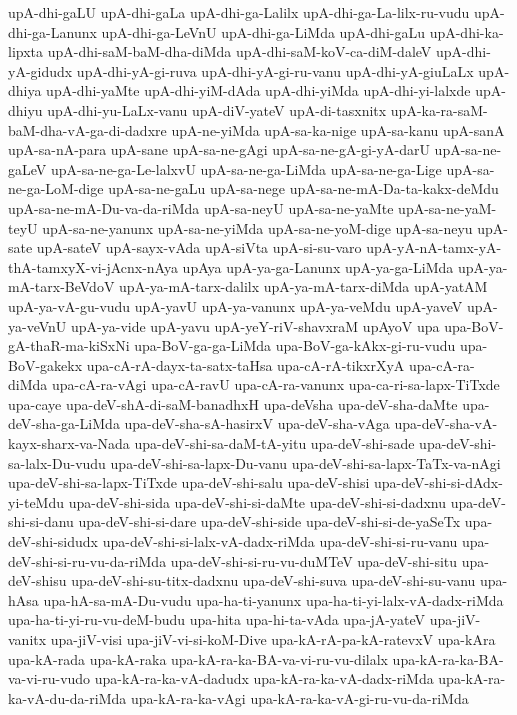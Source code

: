 {upA-dhi-gaLU
upA-dhi-gaLa
upA-dhi-ga-Lalilx
upA-dhi-ga-La-lilx-ru-vudu
upA-dhi-ga-Lanunx
upA-dhi-ga-LeVnU
upA-dhi-ga-LiMda
upA-dhi-gaLu
upA-dhi-ka-lipxta
upA-dhi-saM-baM-dha-diMda
upA-dhi-saM-koV-ca-diM-daleV
upA-dhi-yA-gidudx
upA-dhi-yA-gi-ruva
upA-dhi-yA-gi-ru-vanu
upA-dhi-yA-giuLaLx
upA-dhiya
upA-dhi-yaMte
upA-dhi-yiM-dAda
upA-dhi-yiMda
upA-dhi-yi-lalxde
upA-dhiyu
upA-dhi-yu-LaLx-vanu
upA-diV-yateV
upA-di-tasxnitx
upA-ka-ra-saM-baM-dha-vA-ga-di-dadxre
upA-ne-yiMda
upA-sa-ka-nige
upA-sa-kanu
upA-sanA
upA-sa-nA-para
upA-sane
upA-sa-ne-gAgi
upA-sa-ne-gA-gi-yA-darU
upA-sa-ne-gaLeV
upA-sa-ne-ga-Le-lalxvU
upA-sa-ne-ga-LiMda
upA-sa-ne-ga-Lige
upA-sa-ne-ga-LoM-dige
upA-sa-ne-gaLu
upA-sa-nege
upA-sa-ne-mA-Da-ta-kakx-deMdu
upA-sa-ne-mA-Du-va-da-riMda
upA-sa-neyU
upA-sa-ne-yaMte
upA-sa-ne-yaM-teyU
upA-sa-ne-yanunx
upA-sa-ne-yiMda
upA-sa-ne-yoM-dige
upA-sa-neyu
upA-sate
upA-sateV
upA-sayx-vAda
upA-siVta
upA-si-su-varo
upA-yA-nA-tamx-yA-thA-tamxyX-vi-jAcnx-nAya
upAya
upA-ya-ga-Lanunx
upA-ya-ga-LiMda
upA-ya-mA-tarx-BeVdoV
upA-ya-mA-tarx-dalilx
upA-ya-mA-tarx-diMda
upA-yatAM
upA-ya-vA-gu-vudu
upA-yavU
upA-ya-vanunx
upA-ya-veMdu
upA-yaveV
upA-ya-veVnU
upA-ya-vide
upA-yavu
upA-yeY-riV-shavxraM
upAyoV
upa
upa-BoV-gA-thaR-ma-kiSxNi
upa-BoV-ga-ga-LiMda
upa-BoV-ga-kAkx-gi-ru-vudu
upa-BoV-gakekx
upa-cA-rA-dayx-ta-satx-taHsa
upa-cA-rA-tikxrXyA
upa-cA-ra-diMda
upa-cA-ra-vAgi
upa-cA-ravU
upa-cA-ra-vanunx
upa-ca-ri-sa-lapx-TiTxde
upa-caye
upa-deV-shA-di-saM-banadhxH
upa-deVsha
upa-deV-sha-daMte
upa-deV-sha-ga-LiMda
upa-deV-sha-sA-hasirxV
upa-deV-sha-vAga
upa-deV-sha-vA-kayx-sharx-va-Nada
upa-deV-shi-sa-daM-tA-yitu
upa-deV-shi-sade
upa-deV-shi-sa-lalx-Du-vudu
upa-deV-shi-sa-lapx-Du-vanu
upa-deV-shi-sa-lapx-TaTx-va-nAgi
upa-deV-shi-sa-lapx-TiTxde
upa-deV-shi-salu
upa-deV-shisi
upa-deV-shi-si-dAdx-yi-teMdu
upa-deV-shi-sida
upa-deV-shi-si-daMte
upa-deV-shi-si-dadxnu
upa-deV-shi-si-danu
upa-deV-shi-si-dare
upa-deV-shi-side
upa-deV-shi-si-de-yaSeTx
upa-deV-shi-sidudx
upa-deV-shi-si-lalx-vA-dadx-riMda
upa-deV-shi-si-ru-vanu
upa-deV-shi-si-ru-vu-da-riMda
upa-deV-shi-si-ru-vu-duMTeV
upa-deV-shi-situ
upa-deV-shisu
upa-deV-shi-su-titx-dadxnu
upa-deV-shi-suva
upa-deV-shi-su-vanu
upa-hAsa
upa-hA-sa-mA-Du-vudu
upa-ha-ti-yanunx
upa-ha-ti-yi-lalx-vA-dadx-riMda
upa-ha-ti-yi-ru-vu-deM-budu
upa-hita
upa-hi-ta-vAda
upa-jA-yateV
upa-jiV-vanitx
upa-jiV-visi
upa-jiV-vi-si-koM-Dive
upa-kA-rA-pa-kA-ratevxV
upa-kAra
upa-kA-rada
upa-kA-raka
upa-kA-ra-ka-BA-va-vi-ru-vu-dilalx
upa-kA-ra-ka-BA-va-vi-ru-vudo
upa-kA-ra-ka-vA-dadudx
upa-kA-ra-ka-vA-dadx-riMda
upa-kA-ra-ka-vA-du-da-riMda
upa-kA-ra-ka-vAgi
upa-kA-ra-ka-vA-gi-ru-vu-da-riMda
}
